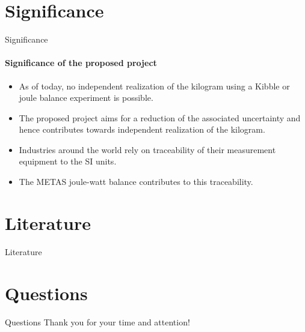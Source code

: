 \documentclass{beamer}
\begin{document}
\section{Significance}
\begin{frame}[allowframebreaks]{Significance}
  \framesubtitle{Significance of the proposed project}
    \begin{itemize}
        \item As of today, no independent realization of the kilogram using a Kibble or joule balance experiment is possible.
        \item The proposed project aims for a reduction of the associated uncertainty and hence contributes towards independent realization of the kilogram.
        \item Industries around the world rely on traceability of their measurement equipment to the SI units.
        \item The METAS joule-watt balance contributes to this traceability.
    \end{itemize}
\end{frame}

\section*{Literature}
\begin{frame}[allowframebreaks]{Literature}
\scriptsize


\nocite{Eichenberger_2022}
\nocite{Fang_2020}
\nocite{Haddad_2017}
\nocite{Kibble1976}
\nocite{Stock_2023}
\nocite{Xu_2016}
\end{frame}

\section*{Questions}
\begin{frame}[allowframebreaks]{Questions}
Thank you for your time and attention!
\end{frame}

\appendix
\end{document}
